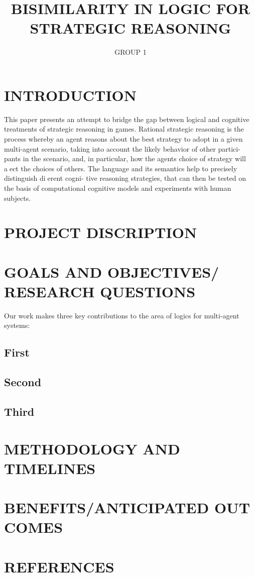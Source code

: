 \documentclass[10pt,a4paper]{article}
\begin{document}
\author{GROUP 1}
\title{\textbf{BISIMILARITY IN LOGIC FOR STRATEGIC REASONING}}
\maketitle
\section{INTRODUCTION}
This paper presents an attempt to bridge the gap between logical and cognitive
treatments of strategic reasoning in games. Rational strategic reasoning is the
process whereby an agent reasons about the best strategy to adopt in a given
multi-agent scenario, taking into account the likely behavior of other partici-
pants in the scenario, and, in particular, how the agents choice of strategy will
aect the choices of others.
The language and its semantics help to precisely distinguish dierent cogni-
tive reasoning strategies, that can then be tested on the basis of computational
cognitive models and experiments with human subjects.
	
\section{PROJECT DISCRIPTION}	

\section{GOALS AND OBJECTIVES/ RESEARCH QUESTIONS}	
	Our work makes three key contributions to the area of logics for multi-agent systems:
	\subsection{First}
 
\subsection{Second}

\subsection{Third}

\section{METHODOLOGY AND TIMELINES}

\section{BENEFITS/ANTICIPATED OUT COMES}
\section{REFERENCES}


	
	
\end{document}

